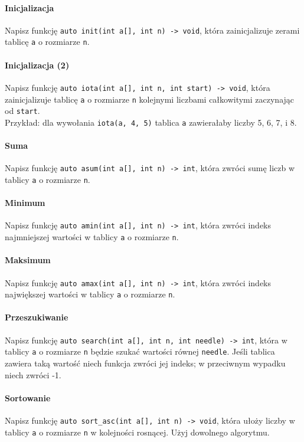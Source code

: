 \documentclass[11pt,a4paper,titlepage,onecolumn]{article}
\begin{document}
\paragraph{Inicjalizacja} Napisz funkcję \texttt{auto init(int a[], int n) ->
void}, która zainicjalizuje zerami tablicę \texttt{a} o rozmiarze \texttt{n}.

\paragraph{Inicjalizacja (2)} Napisz funkcję \texttt{auto iota(int a[], int n,
int start) -> void}, która zainicjalizuje tablicę \texttt{a} o rozmiarze
\texttt{n} kolejnymi liczbami całkowitymi zaczynając od \texttt{start}.\\
Przykład: dla wywołania \texttt{iota(a, 4, 5)} tablica \texttt{a} zawierałaby
liczby 5, 6, 7, i 8.

\paragraph{Suma} Napisz funkcję \texttt{auto asum(int a[], int n) -> int}, która
zwróci sumę liczb w tablicy \texttt{a} o rozmiarze \texttt{n}.

\paragraph{Minimum} Napisz funkcję \texttt{auto amin(int a[], int n) ->
int}, która zwróci indeks najmniejszej wartości w tablicy \texttt{a} o rozmiarze
\texttt{n}.

\paragraph{Maksimum} Napisz funkcję \texttt{auto amax(int a[], int n) ->
int}, która zwróci indeks największej wartości w tablicy \texttt{a} o rozmiarze
\texttt{n}.

\paragraph{Przeszukiwanie} Napisz funkcję \texttt{auto search(int a[], int n,
int needle) -> int}, która w tablicy \texttt{a} o rozmiarze \texttt{n} będzie
szukać wartości równej \texttt{needle}. Jeśli tablica zawiera taką wartość niech
funkcja zwróci jej indeks; w przeciwnym wypadku niech zwróci -1.

\paragraph{Sortowanie} Napisz funkcję \texttt{auto sort\_asc(int a[], int n) ->
void}, która ułoży liczby w tablicy \texttt{a} o rozmiarze \texttt{n} w
kolejności rosnącej. Użyj dowolnego algorytmu.
\end{document}
